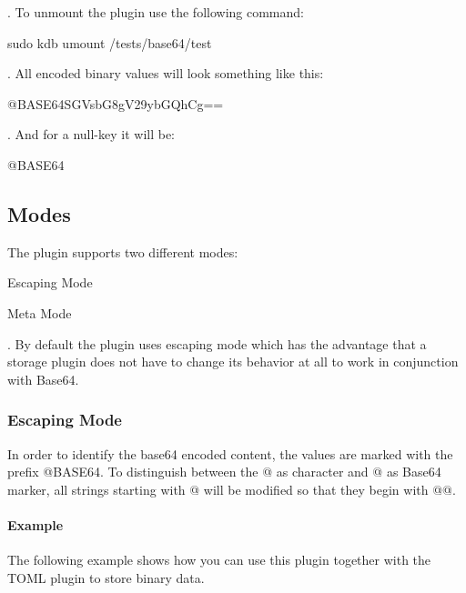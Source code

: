 . To unmount the plugin use the following command\+:


\begin{DoxyCode}
sudo kdb umount /tests/base64/test
\end{DoxyCode}


. All encoded binary values will look something like this\+:


\begin{DoxyCode}
@BASE64SGVsbG8gV29ybGQhCg==
\end{DoxyCode}


. And for a null-\/key it will be\+:


\begin{DoxyCode}
@BASE64
\end{DoxyCode}
\hypertarget{autotoc_md51_autotoc_md54}{}\subsection{Modes}\label{autotoc_md51_autotoc_md54}
The plugin supports two different modes\+:


\begin{DoxyEnumerate}
\item Escaping Mode
\item Meta Mode
\end{DoxyEnumerate}

. By default the plugin uses escaping mode which has the advantage that a storage plugin does not have to change its behavior at all to work in conjunction with Base64.\hypertarget{autotoc_md51_autotoc_md55}{}\subsubsection{Escaping Mode}\label{autotoc_md51_autotoc_md55}
In order to identify the base64 encoded content, the values are marked with the prefix {\ttfamily @B\+A\+S\+E64}. To distinguish between the {\ttfamily @} as character and {\ttfamily @} as Base64 marker, all strings starting with {\ttfamily @} will be modified so that they begin with {\ttfamily @@}.\hypertarget{autotoc_md51_autotoc_md56}{}\paragraph{Example}\label{autotoc_md51_autotoc_md56}
The following example shows how you can use this plugin together with the T\+O\+ML plugin to store binary data.


